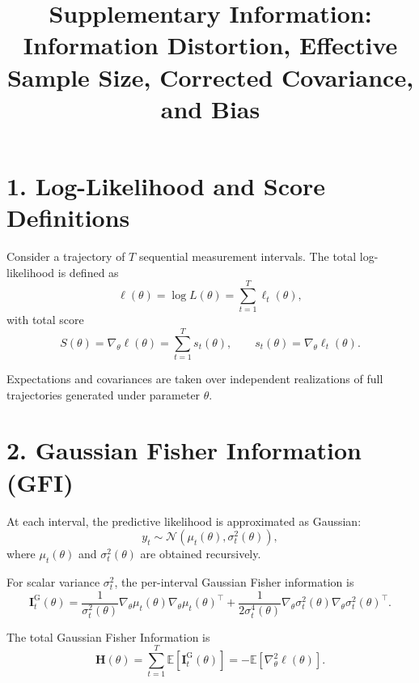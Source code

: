 \documentclass[11pt]{article}
\title{Supplementary Information: Information Distortion, Effective Sample Size, Corrected Covariance, and Bias}
\author{}
\date{}
\begin{document}
\maketitle

\section*{1. Log-Likelihood and Score Definitions}

Consider a trajectory of $T$ sequential measurement intervals.
The total log-likelihood is defined as
\begin{equation}
\ell(\theta) = \log L(\theta) = \sum_{t=1}^T \ell_t(\theta),
\end{equation}
with total score
\begin{equation}
S(\theta) = \nabla_\theta \ell(\theta)
= \sum_{t=1}^T s_t(\theta),
\qquad
s_t(\theta) = \nabla_\theta \ell_t(\theta).
\end{equation}

Expectations and covariances are taken over independent realizations of full trajectories generated under parameter $\theta$.

\section*{2. Gaussian Fisher Information (GFI)}

At each interval, the predictive likelihood is approximated as Gaussian:
\begin{equation}
y_t \sim \mathcal{N}\!\left(\mu_t(\theta), \sigma_t^2(\theta)\right),
\end{equation}
where $\mu_t(\theta)$ and $\sigma_t^2(\theta)$ are obtained recursively.

For scalar variance $\sigma_t^2$, the per-interval Gaussian Fisher information is
\begin{equation}
\mathbf I_t^{\mathrm{G}}(\theta)
=
\frac{1}{\sigma_t^2(\theta)}
\nabla_\theta \mu_t(\theta)
\nabla_\theta \mu_t(\theta)^\top
+
\frac{1}{2\sigma_t^4(\theta)}
\nabla_\theta \sigma_t^2(\theta)
\nabla_\theta \sigma_t^2(\theta)^\top.
\end{equation}

The total Gaussian Fisher Information is
\begin{equation}
\mathbf H(\theta)
=
\sum_{t=1}^T \mathbb{E}\!\left[\mathbf I_t^{\mathrm{G}}(\theta)\right]
=
- \mathbb{E}\!\left[\nabla_\theta^2 \ell(\theta)\right].
\end{equation}
\end{document}
